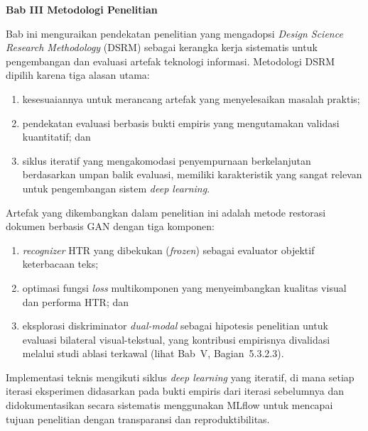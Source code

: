 

\sloppy

\vspace{2cm}
\begin{center}
    {\fontsize{14}{16.8}\selectfont\textbf{Bab III \quad Metodologi Penelitian}}
\end{center}
\label{sec:metodologi}
\setcounter{section}{3}
\setcounter{subsection}{0}
\setcounter{table}{0}
\setcounter{figure}{0}
\vspace{0.8em}

Bab ini menguraikan pendekatan penelitian yang mengadopsi \textit{Design Science Research Methodology} (DSRM) sebagai kerangka kerja sistematis untuk pengembangan dan evaluasi artefak teknologi informasi. Metodologi DSRM dipilih karena tiga alasan utama:
\begin{enumerate}[label=(\arabic*), leftmargin=*, nosep]
    \item kesesuaiannya untuk merancang artefak yang menyelesaikan masalah praktis;
    \item pendekatan evaluasi berbasis bukti empiris yang mengutamakan validasi kuantitatif; dan
    \item siklus iteratif yang mengakomodasi penyempurnaan berkelanjutan berdasarkan umpan balik evaluasi, memiliki karakteristik yang sangat relevan untuk pengembangan sistem \textit{deep learning}.
\end{enumerate}
Artefak yang dikembangkan dalam penelitian ini adalah metode restorasi dokumen berbasis GAN dengan tiga komponen:
\begin{enumerate}[label=(\arabic*), leftmargin=*, nosep]
    \item \textit{recognizer} HTR yang dibekukan (\textit{frozen}) sebagai evaluator objektif keterbacaan teks;
    \item optimasi fungsi \textit{loss} multikomponen yang menyeimbangkan kualitas visual dan performa HTR; dan
    \item eksplorasi diskriminator \textit{dual-modal} sebagai hipotesis penelitian untuk evaluasi bilateral visual-tekstual, yang kontribusi empirisnya divalidasi melalui studi ablasi terkawal (lihat Bab~V, Bagian~5.3.2.3).
\end{enumerate}
Implementasi teknis mengikuti siklus \textit{deep learning} yang iteratif, di mana setiap iterasi eksperimen didasarkan pada bukti empiris dari iterasi sebelumnya dan didokumentasikan secara sistematis menggunakan MLflow untuk mencapai tujuan penelitian dengan transparansi dan reproduktibilitas.

